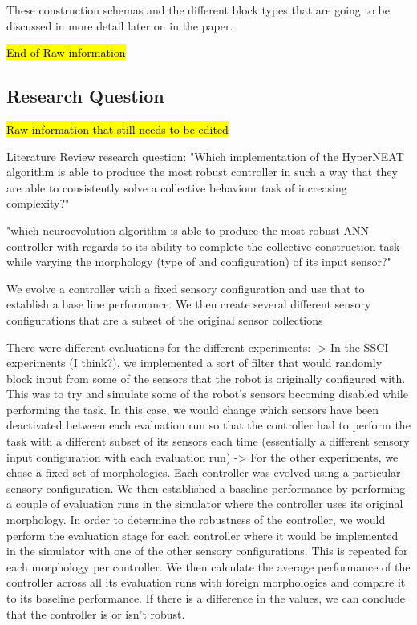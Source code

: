 \documentclass[conference]{IEEEtran}
\begin{document}
These construction schemas and the different block types that are going to be discussed in more detail later on in the paper.


\hl{End of Raw information}

\subsection{Research Question}

\hl{Raw information that still needs to be edited}


Literature Review research question:
"Which implementation of the HyperNEAT algorithm is able to produce the most robust controller in such a way that they are able to consistently solve a collective behaviour task of increasing complexity?"


"which neuroevolution algorithm is able to produce the most robust ANN controller with regards to its ability to complete the collective construction task while varying the morphology (type of and configuration) of its input sensor?"

We evolve a controller with a fixed sensory configuration and use that to establish a base line performance. We then create several different sensory configurations that are a subset of the original sensor collections

There were different evaluations for the different experiments:
-> In the SSCI experiments (I think?), we implemented a sort of filter that would randomly block input from some of the sensors that the robot is originally configured with. This was to try and simulate some of the robot's sensors becoming disabled while performing the task. In this case, we would change which sensors have been deactivated between each evaluation run so that the controller had to perform the task with a different subset of its sensors each time (essentially a different sensory input configuration with each evaluation run)
-> For the other experiments, we chose a fixed set of morphologies. Each controller was evolved using a particular sensory configuration. We then established a baseline performance by performing a couple of evaluation runs in the simulator where the controller uses its original morphology. In order to determine the robustness of the controller, we would perform the evaluation stage for each controller where it would be implemented in the simulator with one of the other sensory configurations. This is repeated for each morphology per controller. We then calculate the average performance of the controller across all its evaluation runs with foreign morphologies and compare it to its baseline performance. If there is a difference in the values, we can conclude that the controller is or isn't robust. 
\end{document}
